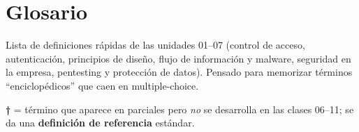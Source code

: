 \documentclass[../main.tex]{subfiles}
\begin{document}
\section{Glosario}

Lista de definiciones rápidas de las unidades 01--07 (control de acceso, autenticación, principios de diseño, flujo de información y malware, seguridad en la empresa, pentesting y protección de datos). Pensado para memorizar términos ``enciclopédicos'' que caen en multiple-choice.

\begin{destacado}
\textbf{†} = término que aparece en parciales pero \emph{no} se desarrolla en las clases 06--11; se da una \textbf{definición de referencia} estándar.
\end{destacado}

\newcommand{\gloss}[1]{\subsection*{#1}}
\end{document}
